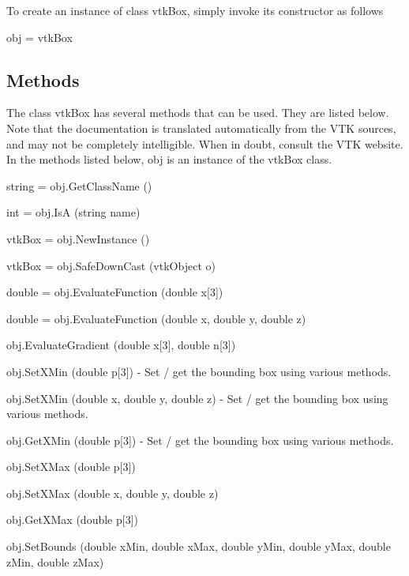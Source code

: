 To create an instance of class vtk\-Box, simply invoke its constructor as follows \begin{DoxyVerb}  obj = vtkBox
\end{DoxyVerb}
 \hypertarget{vtkwidgets_vtkxyplotwidget_Methods}{}\subsection{Methods}\label{vtkwidgets_vtkxyplotwidget_Methods}
The class vtk\-Box has several methods that can be used. They are listed below. Note that the documentation is translated automatically from the V\-T\-K sources, and may not be completely intelligible. When in doubt, consult the V\-T\-K website. In the methods listed below, {\ttfamily obj} is an instance of the vtk\-Box class. 
\begin{DoxyItemize}
\item {\ttfamily string = obj.\-Get\-Class\-Name ()}  
\item {\ttfamily int = obj.\-Is\-A (string name)}  
\item {\ttfamily vtk\-Box = obj.\-New\-Instance ()}  
\item {\ttfamily vtk\-Box = obj.\-Safe\-Down\-Cast (vtk\-Object o)}  
\item {\ttfamily double = obj.\-Evaluate\-Function (double x\mbox{[}3\mbox{]})}  
\item {\ttfamily double = obj.\-Evaluate\-Function (double x, double y, double z)}  
\item {\ttfamily obj.\-Evaluate\-Gradient (double x\mbox{[}3\mbox{]}, double n\mbox{[}3\mbox{]})}  
\item {\ttfamily obj.\-Set\-X\-Min (double p\mbox{[}3\mbox{]})} -\/ Set / get the bounding box using various methods.  
\item {\ttfamily obj.\-Set\-X\-Min (double x, double y, double z)} -\/ Set / get the bounding box using various methods.  
\item {\ttfamily obj.\-Get\-X\-Min (double p\mbox{[}3\mbox{]})} -\/ Set / get the bounding box using various methods.  
\item {\ttfamily obj.\-Set\-X\-Max (double p\mbox{[}3\mbox{]})}  
\item {\ttfamily obj.\-Set\-X\-Max (double x, double y, double z)}  
\item {\ttfamily obj.\-Get\-X\-Max (double p\mbox{[}3\mbox{]})}  
\item {\ttfamily obj.\-Set\-Bounds (double x\-Min, double x\-Max, double y\-Min, double y\-Max, double z\-Min, double z\-Max)}  

\end{DoxyItemize}
